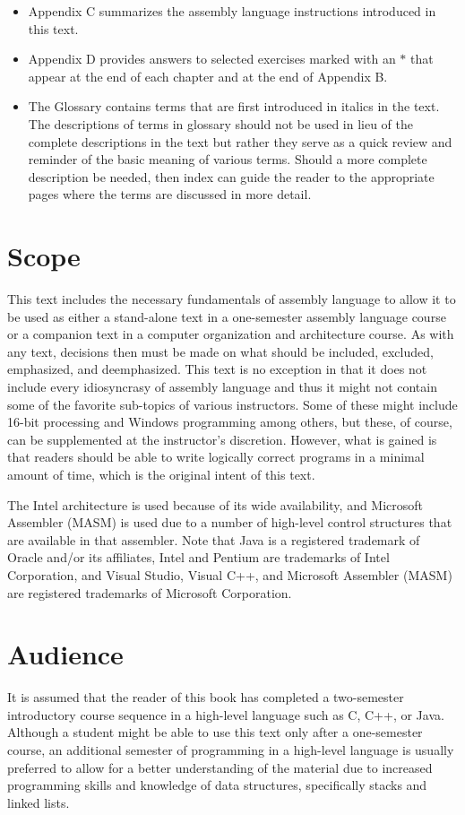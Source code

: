 \documentclass[10pt]{book}
\begin{document}
\begin{itemize}
  \item Appendix C summarizes the assembly language instructions introduced in this text.
  \item Appendix D provides answers to selected exercises marked with an $*$ that appear at the end of each chapter and at the end of Appendix B.
  \item The Glossary contains terms that are first introduced in italics in the text. The descriptions of terms in glossary should not be used in lieu of the complete descriptions in the text but rather they serve as a quick review and reminder of the basic meaning of various terms. Should a more complete description be needed, then index can guide the reader to the appropriate pages where the terms are discussed in more detail.
\end{itemize}


\section{Scope}
This text includes the necessary fundamentals of assembly language to allow it to be used as either a stand-alone text in a one-semester assembly language course or a companion text in a computer organization and architecture course. As with any text, decisions then must be made on what should be included, excluded, emphasized, and deemphasized. This text is no exception in that it does not include every idiosyncrasy of assembly language and thus it might not contain some of the favorite sub-topics of various instructors. Some of these might include 16-bit processing and Windows programming among others, but these, of course, can be supplemented at the instructor's discretion. However, what is gained is that readers should be able to write logically correct programs in a minimal amount of time, which is the original intent of this text.


The Intel architecture is used because of its wide availability, and Microsoft Assembler (MASM) is used due to a number of high-level control structures that are available in that assembler. Note that Java is a registered trademark of Oracle and/or its affiliates, Intel and Pentium are trademarks of Intel Corporation, and Visual Studio, Visual C++, and Microsoft Assembler (MASM) are registered trademarks of Microsoft Corporation.

\section{Audience}
It is assumed that the reader of this book has completed a two-semester introductory course sequence in a high-level language such as C, C++, or Java. Although a student might be able to use this text only after a one-semester course, an additional semester of programming in a high-level language is usually preferred to allow for a better understanding of the material due to increased programming skills and knowledge of data structures, specifically stacks and linked lists.
\end{document}
